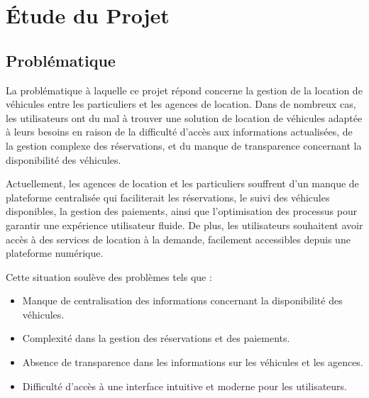 \chapter{Étude du Projet}
\label{chap:EtudeduProjet}

\section{Problématique}
La problématique à laquelle ce projet répond concerne la gestion de la location de véhicules entre les particuliers et les agences de location. Dans de nombreux cas, les utilisateurs ont du mal à trouver une solution de location de véhicules adaptée à leurs besoins en raison de la difficulté d'accès aux informations actualisées, de la gestion complexe des réservations, et du manque de transparence concernant la disponibilité des véhicules. 

Actuellement, les agences de location et les particuliers souffrent d'un manque de plateforme centralisée qui faciliterait les réservations, le suivi des véhicules disponibles, la gestion des paiements, ainsi que l'optimisation des processus pour garantir une expérience utilisateur fluide. De plus, les utilisateurs souhaitent avoir accès à des services de location à la demande, facilement accessibles depuis une plateforme numérique.

Cette situation soulève des problèmes tels que :
\begin{itemize}
    \item Manque de centralisation des informations concernant la disponibilité des véhicules.
    \item Complexité dans la gestion des réservations et des paiements.
    \item Absence de transparence dans les informations sur les véhicules et les agences.
    \item Difficulté d'accès à une interface intuitive et moderne pour les utilisateurs.
\end{itemize}

